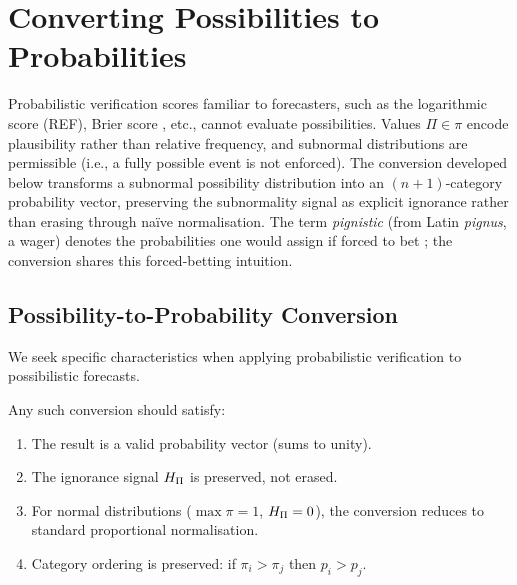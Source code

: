 
\section{Converting Possibilities to Probabilities}%
\label{sec:pignistic_bridge}

Probabilistic verification scores familiar to
forecasters,
such as the logarithmic score (REF),
Brier score \citep{Brier1950-lc}, etc.,
cannot evaluate possibilities.
Values $\Pi \in \pi$ encode plausibility rather
than relative frequency,
and subnormal distributions are permissible
(i.e., a fully possible event is not enforced).
The conversion developed below transforms a
subnormal possibility distribution into an
$(n{+}1)$-category probability vector,
preserving the subnormality signal as explicit
ignorance rather than erasing through na\"ive
normalisation.
The term \textit{pignistic}
(from Latin \textit{pignus}, a wager) denotes
the probabilities one would assign if forced to
bet \citep{Hagedorn2009-pc};
the conversion shares this forced-betting
intuition.

\subsection{Possibility-to-Probability Conversion}%
\label{sec:poss_prob_bridge}

We seek specific characteristics when applying
probabilistic verification to possibilistic
forecasts.

\begin{workedexample}[Desiderata]
Any such conversion should satisfy:
\begin{enumerate}[leftmargin=2em, label=(\roman*)]
\item The result is a valid probability vector (sums to unity).
\item The ignorance signal $H_{\Pi}$ is preserved, not erased.
\item For normal distributions ($\max\pi = 1$, $H_{\Pi} = 0$), the
    conversion reduces to standard proportional normalisation.
\item Category ordering is preserved: if $\pi_i > \pi_j$ then
    $p_i > p_j$.
\end{enumerate}
\end{workedexample}

